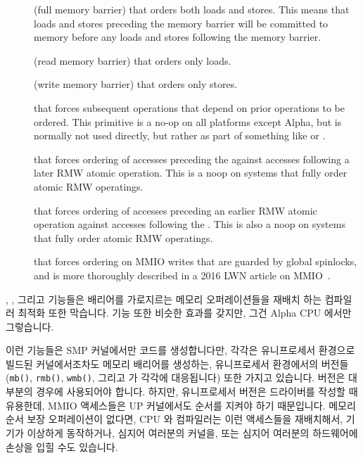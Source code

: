\begin{description}
\item	[] (full memory barrier) that orders both loads and
	stores.
	This means that loads and stores preceding the memory barrier
	will be committed to memory before any loads and stores
	following the memory barrier.
\item	[] (read memory barrier) that orders only loads.
\item	[] (write memory barrier) that orders only stores.
\item	[] that forces subsequent operations
	that depend on prior operations to be ordered.
	This primitive is a no-op on all platforms except Alpha, but
	is normally not used directly, but rather as part of
	something like  or
	.
\item	[] that forces ordering of accesses
	preceding the  against accesses following
	a later RMW atomic operation.
	This is a noop on systems that fully order atomic RMW operatings.
\item	[] that forces ordering of accesses
	preceding an earlier RMW atomic operation against accesses
	following the .
	This is also a noop on systems that fully order atomic RMW operatings.
\item	[] that forces ordering on MMIO writes that are guarded
	by global spinlocks, and is more thoroughly described
	in a 2016 LWN article on MMIO~\cite{PaulEMcKenney2016LinuxKernelMMIO}.
\fi
\end{description}
, , 그리고  기능들은 배리어를
가로지르는 메모리 오퍼레이션들을 재배치 하는 컴파일러 최적화 또한 막습니다.
 기능 또한 비슷한 효과를 갖지만, 그건 Alpha CPU
에서만 그렇습니다.

이런 기능들은 SMP 커널에서만 코드를 생성합니다만, 각각은 유니프로세서 환경으로
빌드된 커널에서조차도 메모리 배리어를 생성하는, 유니프로세서 환경에서의 버전들
({\tt mb()}, {\tt rmb()}, {\tt wmb()}, 그리고  가
각각에 대응됩니다) 또한 가지고 있습니다.
 버전은 대부분의 경우에 사용되어야 합니다.
하지만, 유니프로세서 버전은 드라이버를 작성할 때 유용한데, MMIO 액세스들은 UP
커널에서도 순서를 지켜야 하기 때문입니다.
메모리 순서 보장 오퍼레이션이 없다면, CPU 와 컴파일러는 이런 액세스들을
재배치해서, 기기가 이상하게 동작하거나, 심지어 여러분의 커널을, 또는 심지어
여러분의 하드웨어에 손상을 입힐 수도 있습니다.
\iffalse

